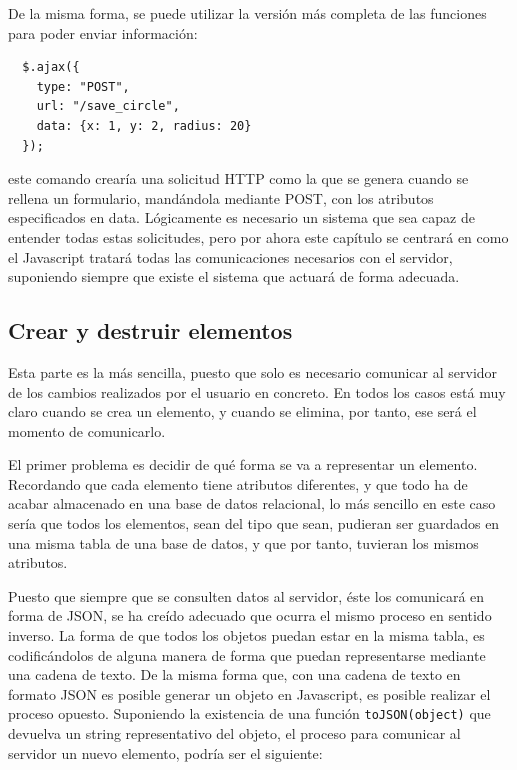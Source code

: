 De la misma forma, se puede utilizar la versión más completa de las funciones para poder enviar información:

\begin{verbatim}
  $.ajax({
    type: "POST",
    url: "/save_circle",
    data: {x: 1, y: 2, radius: 20}
  });
\end{verbatim} 

este comando crearía una solicitud HTTP como la que se genera cuando se rellena un formulario, mandándola mediante POST, con los atributos especificados en data. Lógicamente es necesario un sistema que sea capaz de entender todas estas solicitudes, pero por ahora este capítulo se centrará en como el Javascript tratará todas las comunicaciones necesarios con el servidor, suponiendo siempre que existe el sistema que actuará de forma adecuada.

\newpage
\subsection{Crear y destruir elementos} %
\label{ssub:crear_y_destruir_elementos}

Esta parte es la más sencilla, puesto que solo es necesario comunicar al servidor de los cambios realizados por el usuario en concreto. En todos los casos está muy claro cuando se crea un elemento, y cuando se elimina, por tanto, ese será el momento de comunicarlo. 

El primer problema es decidir de qué forma se va a representar un elemento. Recordando que cada elemento tiene atributos diferentes, y que todo ha de acabar almacenado en una base de datos relacional, lo más sencillo en este caso sería que todos los elementos, sean del tipo que sean, pudieran ser guardados en una misma tabla de una base de datos, y que por tanto, tuvieran los mismos atributos.

Puesto que siempre que se consulten datos al servidor, éste los comunicará en forma de JSON, se ha creído adecuado que ocurra el mismo proceso en sentido inverso. La forma de que todos los objetos puedan estar en la misma tabla, es codificándolos de alguna manera de forma que puedan representarse mediante una cadena de texto. De la misma forma que, con una cadena de texto en formato JSON es posible generar un objeto en Javascript, es posible realizar el proceso opuesto. Suponiendo la existencia de una función \texttt{toJSON(object)} que devuelva un string representativo del objeto, el proceso para comunicar al servidor un nuevo elemento, podría ser el siguiente:

